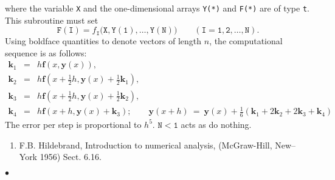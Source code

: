 where the variable {\tt X} and the one-dimensional arrays {\tt Y(*)}
and {\tt F(*)} are of type {\tt t}. This subroutine must set
$$\mathtt{F(I)} = f_{\mathtt{I}}(\mathtt{X,Y(1),\ldots,Y(N))} \qquad
(\mathtt{I = 1,2,\ldots,N}).$$
\Method
Using boldface quantities to denote vectors of length $n$, the
computational sequence is as follows:
\begin{eqnarray*}
\mathbf{k}_1 & = & \textstyle h \mathbf{f}(x,\mathbf{y}(x)), \\[2mm]
\mathbf{k}_2 & = & \textstyle h \mathbf{f}(x+\frac{1}{2}h,\mathbf{y}(x)+
\frac{1}{2}\mathbf{k}_1), \\[2mm]
\mathbf{k}_3 & = & \textstyle h \mathbf{f}(x+\frac{1}{2}h,\mathbf{y}(x)+
\frac{1}{2}\mathbf{k}_2), \\[2mm]
\mathbf{k}_4 & = &
\textstyle h \mathbf{f}(x+h,\mathbf{y}(x)+\mathbf{k}_3); \qquad
\mathbf{y}(x+h) \ = \ \textstyle \mathbf{y}(x)+\frac{1}{6}
(\mathbf{k}_1 + 2\mathbf{k}_2 + 2\mathbf{k}_3 + \mathbf{k}_4)
\end{eqnarray*}
The error per step is proportional to $h^5$.
\newpage
\Errorh
$\mathtt{N < 1}$ acts as do nothing.
\Refer
\begin{enumerate}
\item  F.B. Hildebrand, Introduction to numerical analysis,
(McGraw-Hill, New--York 1956) Sect. 6.16.
\end{enumerate}
$\bullet$
